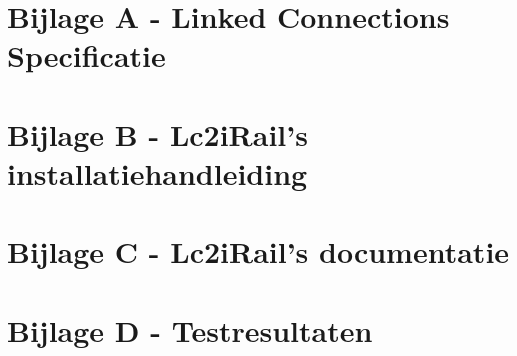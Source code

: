 \begin{appendices}
\section{Bijlage A - Linked Connections Specificatie}
\label{appendix:LinkedConnectionsSpec}

\section{Bijlage B - Lc2iRail's installatiehandleiding}
\section{Bijlage C - Lc2iRail's documentatie}
\section{Bijlage D - Testresultaten}
\end{appendices}